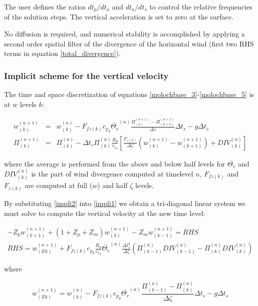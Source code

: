 The user defines the ratios $dt_p/dt_a$ and $dt_a/dt_s$ to
control the relative frequencies of the solution steps. The vertical
acceleration is set to zero at the surface.

No diffusion is required, and numerical stability is accomplished by
applying a second order spatial filter of the divergence of the
horizontal wind (first two RHS terms in equation \ref{total_divergence}).

\subsubsection{Implicit scheme for the vertical velocity}
\label{implicitscheme}

The time and space discretization of equations
\ref{molochbase_3}-\ref{molochbase_5} is at $w$ levels $k$:

\begin{eqnarray}
  \label{impli1}
  w^{(n+1)}_{(k)} &=& w^{(n)}_{(k)} - F_{fz(k)}c_{p_d} \overline{\Theta_v}^{(n)}
      \frac{\Pi^{(n+1)}_{(k)} - \Pi^{(n+1)}_{(k+1)}}{\Delta z} \Delta t_{s} -
      g \Delta t_{s} \\
  \label{impli2}
  \Pi^{(n+1)}_{(k)} &=& \Pi^{(n)}_{(k)} - \Delta t_{s}  \Pi^{(n)}_{(k)}
      \frac{R_d}{c_{v_d}} \left[ \frac{F_{z (k)}}{\Delta \zeta} \left(
      w^{(n+1)}_{(k)} - w^{(n+1)}_{(k+1)} \right) + DIV^{(n)}_{(k)} \right]
\end{eqnarray}

where the average is performed from the above and below half levels for
$\overline{\Theta_v}$ and $DIV^{(n)}_{(k)}$ is the part of wind divergence
computed at timelevel $n$, $F_{fz(k)}$ and $F_{z (k)}$ are computed at full
($w$) and half $\zeta$ levels.

By substituting \ref{impli2} into \ref{impli1} we obtain a tri-diagonal linear
system we must solve to compute the vertical velocity at the new time level:

\begin{eqnarray}
  -Z_p w^{(n+1)}_{(k+1)} + (1 + Z_p + Z_m) w^{(n+1)}_{(k)} -
   Z_m w^{(n+1)}_{(k-1)} = RHS \\
   RHS = w^{(n+1)}_{(Ek)} + F_{fz(k)}c_{p_d}
     \frac{R_d}{c_{v_d}} \overline{\Theta_v}^{(n)}
     \frac{\Delta t_{s}^2}{\Delta \zeta} \left(
     \Pi^{(n)}_{(k-1)}DIV^{(n)}_{(k-1)} - \Pi^{(n)}_{(k)}DIV^{(n)}_{(k)}
     \right)
\end{eqnarray}

where

\begin{equation}
  w^{(n+1)}_{(Ek)} = w^{(n)}_{(k)} - F_{fz(k)}c_{p_d} \overline{\Theta_v}^{(n)}
      \frac{\Pi^{(n)}_{(k-1)} - \Pi^{(n)}_{(k)}}{\Delta \zeta} \Delta t_{s} -
      g \Delta t_{s}
\end{equation}

